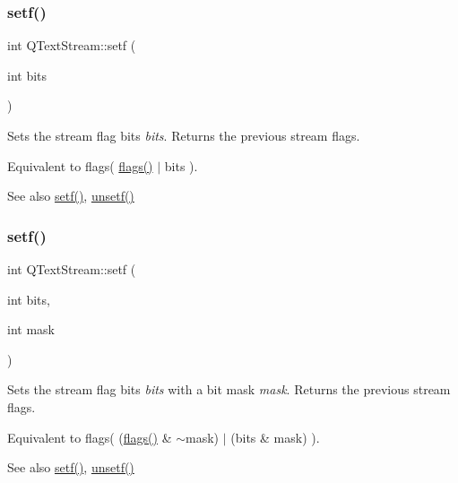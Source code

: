 \subsubsection{\texorpdfstring{setf()}{setf()}\hspace{0.1cm}{\footnotesize\ttfamily [1/2]}}
{\footnotesize\ttfamily int Q\+Text\+Stream\+::setf (\begin{DoxyParamCaption}\item[{int}]{bits }\end{DoxyParamCaption})\hspace{0.3cm}{\ttfamily [inline]}}

Sets the stream flag bits {\itshape bits}. Returns the previous stream flags.

Equivalent to {\ttfamily flags( \mbox{\hyperlink{class_q_text_stream_ab6cf395446ba04973dff067ab8b36978}{flags()}} $\vert$ bits )}.

\begin{DoxySeeAlso}{See also}
\mbox{\hyperlink{class_q_text_stream_adb71ee168e670b470bcbc547b994c5df}{setf()}}, \mbox{\hyperlink{class_q_text_stream_a7f7cb71e79749c7d13217dec5599e627}{unsetf()}} 
\end{DoxySeeAlso}
\mbox{\label{class_q_text_stream_a9d039c1d26bfd52f47b4595dc30a628a}} 
\subsubsection{\texorpdfstring{setf()}{setf()}\hspace{0.1cm}{\footnotesize\ttfamily [2/2]}}
{\footnotesize\ttfamily int Q\+Text\+Stream\+::setf (\begin{DoxyParamCaption}\item[{int}]{bits,  }\item[{int}]{mask }\end{DoxyParamCaption})\hspace{0.3cm}{\ttfamily [inline]}}

Sets the stream flag bits {\itshape bits} with a bit mask {\itshape mask}. Returns the previous stream flags.

Equivalent to {\ttfamily flags( (\mbox{\hyperlink{class_q_text_stream_ab6cf395446ba04973dff067ab8b36978}{flags()}} \& $\sim$mask) $\vert$ (bits \& mask) )}.

\begin{DoxySeeAlso}{See also}
\mbox{\hyperlink{class_q_text_stream_adb71ee168e670b470bcbc547b994c5df}{setf()}}, \mbox{\hyperlink{class_q_text_stream_a7f7cb71e79749c7d13217dec5599e627}{unsetf()}} 
\end{DoxySeeAlso}
\mbox{\label{class_q_text_stream_a0c8656a473fe2b6e26c459e5840e7d07}} 
